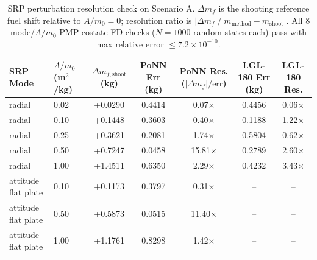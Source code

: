 \begin{table}[t]
\centering
\caption{SRP perturbation resolution check on Scenario A. $\Delta m_f$ is the shooting reference fuel shift relative to $A/m_0=0$; resolution ratio is $|\Delta m_f| / |m_{\mathrm{method}}-m_{\mathrm{shoot}}|$. All 8 mode/$A/m_0$ PMP costate FD checks ($N=1000$ random states each) pass with max relative error $\le 7.2\times 10^{-10}$.}
\label{tab:srp_audit}
\begin{tabular}{llccccc}
\toprule
SRP Mode & $A/m_0$ (m$^2$/kg) & $\Delta m_{f,\mathrm{shoot}}$ (kg) & PoNN Err (kg) & PoNN Res. ($|\Delta m_f|/\text{err}$) & LGL-180 Err (kg) & LGL-180 Res. \\
\midrule
radial & 0.02 & +0.0290 & 0.4414 & 0.07$\times$ & 0.4456 & 0.06$\times$ \\
radial & 0.10 & +0.1448 & 0.3603 & 0.40$\times$ & 0.1188 & 1.22$\times$ \\
radial & 0.25 & +0.3621 & 0.2081 & 1.74$\times$ & 0.5804 & 0.62$\times$ \\
radial & 0.50 & +0.7247 & 0.0458 & 15.81$\times$ & 0.2789 & 2.60$\times$ \\
radial & 1.00 & +1.4511 & 0.6350 & 2.29$\times$ & 0.4232 & 3.43$\times$ \\
attitude flat plate & 0.10 & +0.1173 & 0.3797 & 0.31$\times$ & -- & -- \\
attitude flat plate & 0.50 & +0.5873 & 0.0515 & 11.40$\times$ & -- & -- \\
attitude flat plate & 1.00 & +1.1761 & 0.8298 & 1.42$\times$ & -- & -- \\
\bottomrule
\end{tabular}
\end{table}

